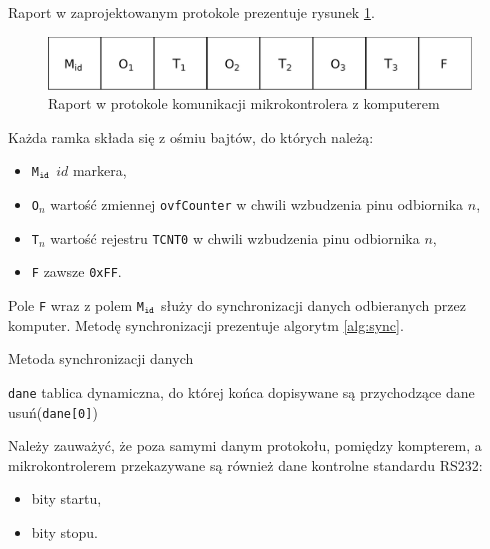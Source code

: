 Raport w zaprojektowanym protokole prezentuje rysunek \ref{fig:protocol}.

\begin{figure}
 \includegraphics[width=\textwidth]{gfx/diagramy/protokol.pdf}
 \caption[Schemat raportu]{Raport w protokole komunikacji mikrokontrolera z komputerem}
 \label{fig:protocol}
\end{figure}

Każda ramka składa się z ośmiu bajtów, do których należą:
\begin{itemize}
 \item \texttt{M$_\textrm{\texttt{id}}$} \ppauza $id$ markera,
 \item \texttt{O$_n$} \ppauza wartość zmiennej \texttt{ovfCounter} w chwili wzbudzenia pinu odbiornika $n$,
 \item \texttt{T$_n$} \ppauza wartość rejestru \texttt{TCNT0} w chwili wzbudzenia pinu odbiornika $n$,
 \item \texttt{F} \ppauza zawsze \texttt{0xFF}.
\end{itemize}

Pole \texttt{F} wraz z polem \texttt{M$_\textrm{\texttt{id}}$} służy do synchronizacji danych odbieranych przez komputer. Metodę synchronizacji prezentuje algorytm \ref{alg:sync}.

\begin{algorithm}
\caption{Metoda synchronizacji danych}
\label{alg:sync}
\begin{algorithmic}[1]
  \REQUIRE \texttt{dane} \ppauza tablica dynamiczna, do której końca dopisywane są przychodzące dane
      \STATE usuń(\texttt{dane[0]})
    \ENDWHILE
  \ENDWHILE
\end{algorithmic}
\end{algorithm}

Należy zauważyć, że poza samymi danym protokołu, pomiędzy kompterem, a mikrokontrolerem przekazywane są również dane kontrolne standardu RS232:
\begin{itemize}
  \item bity startu,
  \item bity stopu.
\end{itemize}

